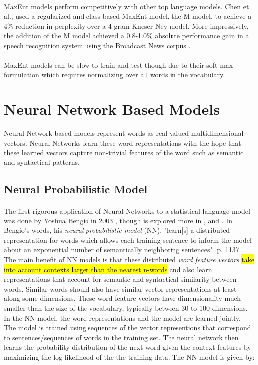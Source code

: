 \documentclass[12pt]{ociamthesis}
\begin{document}
\paragraph{}
MaxEnt models perform competitively with other top language models. Chen et al., used a regularized and class-based MaxEnt model, the M model, to achieve a 4\% reduction in perplexity over a 4-gram Kneser-Ney model. More impressively, the addition of the M model achieved a 0.8-1.0\% absolute performance gain in a speech recognition system using the Broadcast News corpus \cite{Chen2009}.
\paragraph{}
MaxEnt models can be slow to train and test though due to their soft-max formulation which requires normalizing over all words in the vocabulary.

\section{Neural Network Based Models}
\paragraph{}
Neural Network based models represent words as real-valued multidimensional vectors. Neural Networks learn these word representations with the hope that these learned vectors capture non-trivial features of the word such as semantic and syntactical patterns.
\subsection{Neural Probabilistic Model}
\paragraph{}
The first rigorous application of Neural Networks to a statistical language model was done by Yoshua Bengio in 2003 \cite{Bengio2003}, though is explored more in \cite{Collobert2008}, and \cite{HuangEtAl2012} . In Bengio's words, his \emph{neural probabilistic model} (NN), "learn[s] a distributed representation for words which allows each training sentence to inform the model about an exponential number of semantically neighboring sentences" \cite{Bengio2003}[p. 1137] The main benefit of NN models is that these distributed \emph{word feature vectors} \hl{take into account contexts larger than the nearest n-words} and also learn representations that account for semantic and syntactical similarity between words. Similar words should also have similar vector representations at least along some dimensions. These word feature vectors have dimensionality much smaller than the size of the vocabulary, typically between 30 to 100 dimensions. In the NN model, the word representations and the model are learned jointly. The model is trained using sequences of the vector representions that correspond to sentences/sequences of words in the training set. The neural network then learns the probability distribution of the next word given the context features by maximizing the log-likelihood of the the training data. 
The NN model is given by:
\end{document}
